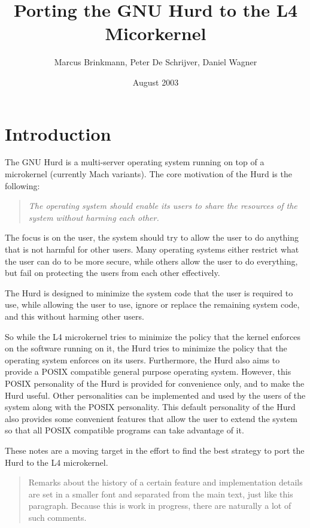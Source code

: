 \documentclass[9pt,a4paper]{extarticle}
\title{Porting the GNU Hurd to the L4 Micorkernel}
\author{Marcus Brinkmann, Peter De Schrijver, Daniel Wagner}
\date{August 2003}
\newenvironment{comment}{\footnotesize \begin{quote}}{\end{quote}}
\begin{document}
\maketitle


\section{Introduction}

The GNU Hurd is a multi-server operating system running on top of a
microkernel (currently Mach variants).  The core motivation of the
Hurd is the following:

\begin{quote}
  \emph{The operating system should enable its users to share the
    resources of the system without harming each other.}
\end{quote}

The focus is on the user, the system should try to allow the user to
do anything that is not harmful for other users.  Many operating
systems either restrict what the user can do to be more secure, while
others allow the user to do everything, but fail on protecting the
users from each other effectively.

The Hurd is designed to minimize the system code that the user is
required to use, while allowing the user to use, ignore or replace the
remaining system code, and this without harming other users.

So while the L4 microkernel tries to minimize the policy that the
kernel enforces on the software running on it, the Hurd tries to
minimize the policy that the operating system enforces on its users.
Furthermore, the Hurd also aims to provide a POSIX compatible general
purpose operating system.  However, this POSIX personality of the Hurd
is provided for convenience only, and to make the Hurd useful.  Other
personalities can be implemented and used by the users of the system
along with the POSIX personality.  This default personality of the
Hurd also provides some convenient features that allow the user to
extend the system so that all POSIX compatible programs can take
advantage of it.

These notes are a moving target in the effort to find the best
strategy to port the Hurd to the L4 microkernel.

\begin{comment}
  Remarks about the history of a certain feature and implementation
  details are set in a smaller font and separated from the main text,
  just like this paragraph.  Because this is work in progress, there
  are naturally a lot of such comments.
\end{comment}
\end{document}
